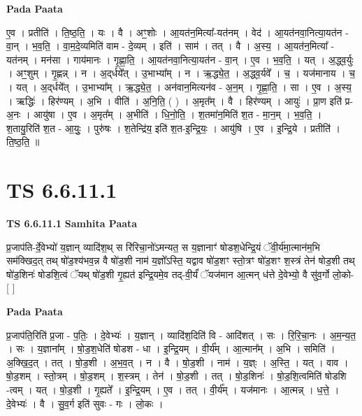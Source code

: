 \documentclass[17pt]{extarticle}
\begin{document}
\textbf{Pada Paata} \newline

ए॒व । प्रतीति॑ । ति॒ष्ठ॒ति॒ । यः । वै । अꣳ॒॒शोः । आ॒यत॑न॒मित्या᳚-यत॑नम् । वेद॑ । आ॒यत॑नवा॒नित्या॒यत॑न - वा॒न् । भ॒व॒ति॒ । वा॒म॒दे॒व्यमिति॑ वाम - दे॒व्यम् । इति॑ । साम॑ । तत् । वै । अ॒स्य॒ । आ॒यत॑न॒मित्या᳚ - यत॑नम् । मन॑सा । गाय॑मानः । गृ॒ह्णा॒ति॒ । आ॒यत॑नवा॒नित्या॒यत॑न - वा॒न् । ए॒व । भ॒व॒ति॒ । यत् । अ॒द्ध्व॒र्युः । अꣳ॒॒शुम् । गृ॒ह्णन्न् । न । अ॒द्‌र्धये᳚त् । उ॒भाभ्या᳚म् । न । ऋ॒द्ध्ये॒त॒ । अ॒द्ध्व॒र्यवे᳚ । च॒ । यज॑मानाय । च॒ । यत् । अ॒द्‌र्धये᳚त् । उ॒भाभ्या᳚म् । ऋ॒द्ध्ये॒त॒ । अन॑वान॒मित्यन॑व - अ॒न॒म् । गृ॒ह्णा॒ति॒ । सा । ए॒व । अ॒स्य॒ । ऋद्धिः॑ । हिर॑ण्यम् । अ॒भि । वीति॑ । अ॒नि॒ति॒ ( ) । अ॒मृत᳚म् । वै । हिर॑ण्यम् । आयुः॑ । प्रा॒ण इति॑ प्र-अ॒नः । आयु॑षा । ए॒व । अ॒मृत᳚म् । अ॒भीति॑ । धि॒नो॒ति॒ । श॒तमा॑न॒मिति॑ श॒त - मा॒न॒म् । भ॒व॒ति॒ । श॒तायु॒रिति॑ श॒त - आ॒युः॒ । पुरु॑षः । श॒तेन्द्रि॑य॒ इति॑ श॒त-इ॒न्द्रि॒यः॒ । आयु॑षि । ए॒व । इ॒न्द्रि॒ये । प्रतीति॑ । ति॒ष्ठ॒ति॒ ॥  \newline




\section*{ TS 6.6.11.1 }

\textbf{TS 6.6.11.1 } \newline
\textbf{Samhita Paata} \newline

प्र॒जाप॑ति-र्दे॒वेभ्यो॑ य॒ज्ञान् व्यादि॑श॒थ् स रि॑रिचा॒नो॑ऽमन्यत॒ स य॒ज्ञानाꣳ॑ षोडश॒धेन्द्रि॒यं ॅवी॒र्य॑मा॒त्मान॑म॒भि सम॑क्खिद॒त् तथ् षो॑ड॒श्य॑भव॒न्न वै षो॑ड॒शी नाम॑ य॒ज्ञो᳚ऽस्ति॒ यद्वाव षो॑ड॒शꣳ स्तो॒त्रꣳ षो॑ड॒शꣳ श॒स्त्रं तेन॑ षोड॒शी तथ् षो॑ड॒शिनः॑ षोडशि॒त्वं ॅयथ् षो॑ड॒शी गृ॒ह्यत॑ इन्द्रि॒यमे॒व तद्-वी॒र्यं॑ ॅयज॑मान आ॒त्मन् ध॑त्ते दे॒वेभ्यो॒ वै सु॑व॒र्गो लो॒को- [  ] \newline

\textbf{Pada Paata} \newline

प्र॒जाप॑ति॒रिति॑ प्र॒जा - प॒तिः॒ । दे॒वेभ्यः॑ । य॒ज्ञान् । व्यादि॑श॒दिति॑ वि - आदि॑शत् । सः । रि॒रि॒चा॒नः । अ॒म॒न्य॒त॒ । सः । य॒ज्ञाना᳚म् । षो॒ड॒श॒धेति॑ षोडश - धा । इ॒न्द्रि॒यम् । वी॒र्य᳚म् । आ॒त्मान᳚म् । अ॒भि । समिति॑ । अ॒क्खि॒द॒त् । तत् । षो॒ड॒शी । अ॒भ॒व॒त् । न । वै । षो॒ड॒शी । नाम॑ । य॒ज्ञ्ः । अ॒स्ति॒ । यत् । वाव । षो॒ड॒शम् । स्तो॒त्रम् । षो॒ड॒शम् । श॒स्त्रम् । तेन॑ । षो॒ड॒शी । तत् । षो॒ड॒शिनः॑ । षो॒ड॒शि॒त्वमिति॑ षोडशि -त्वम् । यत् । षो॒ड॒शी । गृ॒ह्यते᳚ । इ॒न्द्रि॒यम् । ए॒व । तत् । वी॒र्य᳚म् । यज॑मानः । आ॒त्मन्न् । ध॒त्ते॒ । दे॒वेभ्यः॑ । वै । सु॒व॒र्ग इति॑ सुवः - गः । लो॒कः ।  \newline
\end{document}
